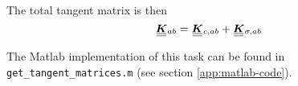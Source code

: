 The total tangent matrix is then
\begin{equation}
  \label{eq:tang-mat}
  \uubar{\bm{K}}_{ab} = \uubar{\bm{K}}_{c,ab} + \uubar{\bm{K}}_{\sigma,ab}
\end{equation}

The Matlab implementation of this task can be found in 
\texttt{get\_tangent\_matrices.m} (see section \ref{app:matlab-code}).


